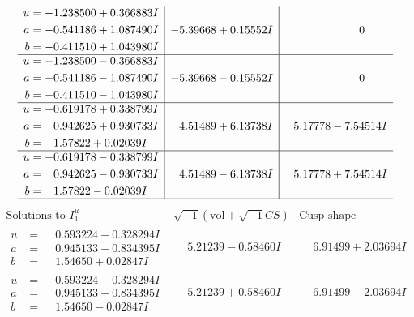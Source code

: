 \documentclass[1p]{elsarticle_modified}
\theoremstyle{definition}
\newcommand{\I}{\sqrt{-1}}
\begin{document}
$$\begin{array}{c|c|c}
\begin{aligned}
u &= -1.238500 + 0.366883 I \\
a &= -0.541186 + 1.087490 I \\
b &= -0.411510 + 1.043980 I\end{aligned}
 & -5.39668 + 0.15552 I & \phantom{-0.000000 } 0 \\ \hline\begin{aligned}
u &= -1.238500 - 0.366883 I \\
a &= -0.541186 - 1.087490 I \\
b &= -0.411510 - 1.043980 I\end{aligned}
 & -5.39668 - 0.15552 I & \phantom{-0.000000 } 0 \\ \hline\begin{aligned}
u &= -0.619178 + 0.338799 I \\
a &= \phantom{-}0.942625 + 0.930733 I \\
b &= \phantom{-}1.57822 + 0.02039 I\end{aligned}
 & \phantom{-}4.51489 + 6.13738 I & \phantom{-}5.17778 - 7.54514 I \\ \hline\begin{aligned}
u &= -0.619178 - 0.338799 I \\
a &= \phantom{-}0.942625 - 0.930733 I \\
b &= \phantom{-}1.57822 - 0.02039 I\end{aligned}
 & \phantom{-}4.51489 - 6.13738 I & \phantom{-}5.17778 + 7.54514 I\\
 \hline 
 \end{array}$$\newpage$$\begin{array}{c|c|c}  
\text{Solutions to }I^u_{1}& \I (\text{vol} + \sqrt{-1}CS) & \text{Cusp shape}\\
 \hline 
\begin{aligned}
u &= \phantom{-}0.593224 + 0.328294 I \\
a &= \phantom{-}0.945133 - 0.834395 I \\
b &= \phantom{-}1.54650 + 0.02847 I\end{aligned}
 & \phantom{-}5.21239 - 0.58460 I & \phantom{-}6.91499 + 2.03694 I \\ \hline\begin{aligned}
u &= \phantom{-}0.593224 - 0.328294 I \\
a &= \phantom{-}0.945133 + 0.834395 I \\
b &= \phantom{-}1.54650 - 0.02847 I\end{aligned}
 & \phantom{-}5.21239 + 0.58460 I & \phantom{-}6.91499 - 2.03694 I \\ \hline\begin{aligned}

\end{aligned}
\end{array}$$
\end{document}

